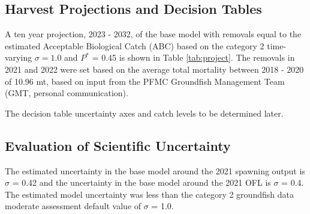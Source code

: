 \documentclass[11pt,
  english,
  a4paper,
]{article}
\begin{document}
\leavevmode\tagmcend\tagstructend\par


\hypertarget{harvest-projections-and-decision-tables}{%
\subsection{Harvest Projections and Decision Tables}\label{harvest-projections-and-decision-tables}}

\leavevmode\tagmcend\tagstructend


A ten year projection, 2023 - 2032, of the base model with removals equal to the estimated Acceptable Biological Catch (ABC) based on the category 2 time-varying {\(\sigma = 1.0\)\leavevmode\tagmcend\tagstructend} and {\(P^*\)\leavevmode\tagmcend\tagstructend} = 0.45 is shown in Table \ref{tab:project}. The removals in 2021 and 2022 were set based on the average total mortality between 2018 - 2020 of 10.96 mt, based on input from the PFMC Groundfish Management Team (GMT, personal communication).

\leavevmode\tagmcend\tagstructend\par


The decision table uncertainty axes and catch levels to be determined later.

\leavevmode\tagmcend\tagstructend\par


\hypertarget{evaluation-of-scientific-uncertainty}{%
\subsection{Evaluation of Scientific Uncertainty}\label{evaluation-of-scientific-uncertainty}}

\leavevmode\tagmcend\tagstructend


The estimated uncertainty in the base model around the 2021 spawning output is {\(\sigma\)\leavevmode\tagmcend\tagstructend} = 0.42 and the uncertainty in the base model around the 2021 OFL is {\(\sigma\)\leavevmode\tagmcend\tagstructend} = 0.4. The estimated model uncertainty was less than the category 2 groundfish data moderate assessment default value of {\(\sigma\)\leavevmode\tagmcend\tagstructend} = 1.0.
\end{document}
